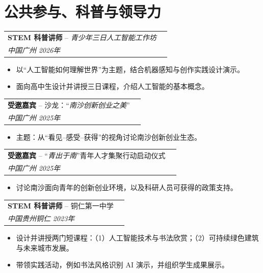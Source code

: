 \section*{公共参与、科普与领导力}

\noindent
\begin{tabularx}{\textwidth}{@{}Xr@{}}
\textbf{STEM 科普讲师} -- \textit{青少年三日人工智能工作坊} \\
\textit{中国广州} \hfill \textit{2026年}
\end{tabularx}
\begin{itemize}[leftmargin=*]
  \item 以“人工智能如何理解世界”为主题，结合机器感知与创作实践设计演示。
  \item 面向高中生设计并讲授三日课程，介绍人工智能的基本概念。
\end{itemize}

\noindent
\begin{tabularx}{\textwidth}{@{}Xr@{}}
\textbf{受邀嘉宾} -- 沙龙：“\textit{南沙创新创业之美}” \\
\textit{中国广州} \hfill \textit{2025年}
\end{tabularx}
\begin{itemize}[leftmargin=*]
  \item 主题：从“看见--感受--获得”的视角讨论南沙创新创业生态。
\end{itemize}

\noindent
\begin{tabularx}{\textwidth}{@{}Xr@{}}
\textbf{受邀嘉宾} -- “\textit{青出于南}”青年人才集聚行动启动仪式\\
\textit{中国广州} \hfill \textit{2025年}
\end{tabularx}
\begin{itemize}[leftmargin=*]
  \item 讨论南沙面向青年的创新创业环境，以及科研人员可获得的政策支持。
\end{itemize}

\noindent
\begin{tabularx}{\textwidth}{@{}Xr@{}}
\textbf{STEM 科普讲师} -- 铜仁第一中学 \\
\textit{中国贵州铜仁} \hfill \textit{2023年}
\end{tabularx}
\begin{itemize}[leftmargin=*]
  \item 设计并讲授两门短课程：（1）人工智能技术与书法欣赏；（2）可持续绿色建筑与未来城市发展。
  \item 带领实践活动，例如书法风格识别 AI 演示，并组织学生成果展示。
\end{itemize}

